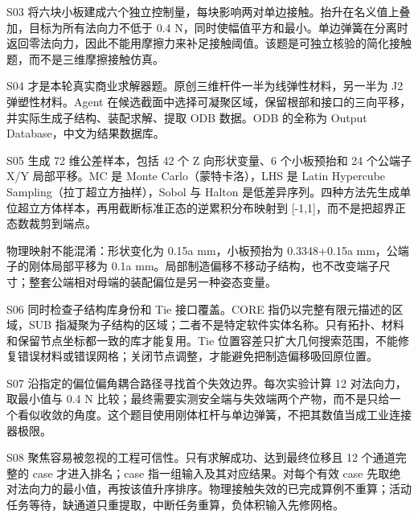 \documentclass[11pt,a4paper]{ctexart}
\begin{document}
\par

S03 将六块小板建成六个独立控制量，每块影响两对单边接触。抬升在名义值上叠加，目标为所有法向力不低于 0.4 N，同时使幅值平方和最小。单边弹簧在分离时返回零法向力，因此不能用摩擦力来补足接触阈值。该题是可独立核验的简化接触题，而不是三维摩擦接触仿真。

\par

S04 才是本轮真实商业求解器题。原创三维杆件一半为线弹性材料，另一半为 J2 弹塑性材料。Agent 在候选截面中选择可凝聚区域，保留根部和接口的三向平移，并实际生成子结构、装配求解、提取 ODB 数据。ODB 的全称为 Output Database，中文为结果数据库。

\par

S05 生成 72 维公差样本，包括 42 个 Z 向形状变量、6 个小板预抬和 24 个公端子 X/Y 局部平移。MC 是 Monte Carlo（蒙特卡洛），LHS 是 Latin Hypercube Sampling（拉丁超立方抽样），Sobol 与 Halton 是低差异序列。四种方法先生成单位超立方体样本，再用截断标准正态的逆累积分布映射到 [-1,1]，而不是把超界正态数裁剪到端点。

\par

物理映射不能混淆：形状变化为 0.15a mm，小板预抬为 0.3348+0.15a mm，公端子的刚体局部平移为 0.1a mm。局部制造偏移不移动子结构，也不改变端子尺寸；整套公端相对母端的装配偏位是另一种姿态变量。

\par

S06 同时检查子结构库身份和 Tie 接口覆盖。CORE 指仍以完整有限元描述的区域，SUB 指凝聚为子结构的区域；二者不是特定软件实体名称。只有拓扑、材料和保留节点坐标都一致的库才能复用。Tie 位置容差只扩大几何搜索范围，不能修复错误材料或错误网格；关闭节点调整，才能避免把制造偏移吸回原位置。

\par

S07 沿指定的偏位偏角耦合路径寻找首个失效边界。每次实验计算 12 对法向力，取最小值与 0.4 N 比较；最终需要实测安全端与失效端两个产物，而不是只给一个看似收敛的角度。这个题目使用刚体杠杆与单边弹簧，不把其数值当成工业连接器极限。

\par

S08 聚焦容易被忽视的工程可信性。只有求解成功、达到最终位移且 12 个通道完整的 case 才进入排名；case 指一组输入及其对应结果。对每个有效 case 先取绝对法向力的最小值，再按该值升序排序。物理接触失效的已完成算例不重算；活动任务等待，缺通道只重提取，中断任务重算，负体积输入先修网格。
\end{document}
